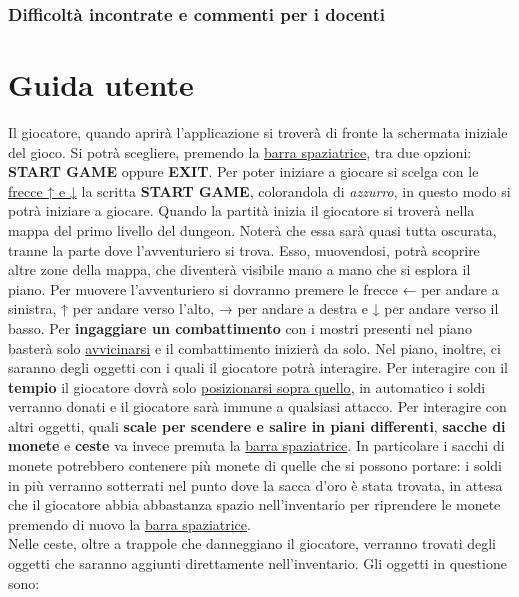 \documentclass{report}
\begin{document}
\subsection{Difficoltà incontrate e commenti per i docenti}

\appendix
\chapter{Guida utente}

Il giocatore, quando aprirà l’applicazione si troverà di fronte la schermata iniziale del gioco. 
%
Si potrà scegliere, premendo la \underline{barra spaziatrice}, tra due opzioni: \textbf{START GAME} oppure \textbf{EXIT}.
%
Per poter iniziare a giocare si scelga con le \underline{frecce ↑ e ↓}  la scritta \textbf{START GAME}, colorandola di \textit{azzurro}, in questo modo si potrà iniziare a giocare.
%
Quando la partità inizia il giocatore si troverà nella mappa del primo livello del dungeon.
%
Noterà che essa sarà quasi tutta oscurata, tranne la parte dove l’avventuriero si trova. 
%
Esso, muovendosi, potrà scoprire altre zone della mappa, che diventerà visibile mano a mano che si esplora il piano.
%
Per muovere l’avventuriero si dovranno premere le frecce ← per andare a sinistra, ↑ per andare verso l’alto, → per andare a destra e ↓ per andare verso il basso.
%
Per \textbf{ingaggiare un combattimento} con i mostri presenti nel piano basterà solo \underline{avvicinarsi} e il combattimento inizierà da solo.
%
Nel piano, inoltre, ci saranno degli oggetti con i quali il giocatore potrà interagire.
%
Per interagire con il \textbf{tempio} il giocatore dovrà solo \underline{posizionarsi sopra quello}, in automatico i soldi verranno donati e il giocatore sarà immune a qualsiasi attacco.
%
Per interagire con altri oggetti, quali \textbf{scale per scendere e salire in piani differenti}, \textbf{sacche di monete} e \textbf{ceste} va invece premuta la \underline{barra spaziatrice}.
%
In particolare i sacchi di monete potrebbero contenere più monete di quelle che si possono portare: i soldi in più verranno sotterrati nel punto dove la sacca d’oro è stata trovata, in attesa che il giocatore abbia abbastanza spazio nell’inventario per riprendere le monete premendo di nuovo la \underline{barra spaziatrice}. 
%
\\
%
Nelle ceste, oltre a trappole che danneggiano il giocatore, verranno trovati degli oggetti che saranno aggiunti direttamente nell’inventario.
%
Gli oggetti in questione sono:
%
\end{document}
